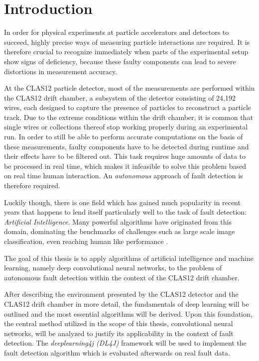 \chapter{Introduction}

In order for physical experiments at particle accelerators and
detectors to succeed, highly precise ways
of measuring particle interactions are required. It is therefore
crucial to recognize immediately when parts of the experimental setup
show signs of deficiency, because these faulty components can lead to
severe distortions in measurement accuracy.

At the CLAS12 particle detector, most of the measurements are
performed within the CLAS12 drift chamber, a subsystem of the detector
consisting of 24,192 wires, each designed to capture the presence of
particles to reconstruct a particle track. Due to the extreme
conditions within the drift chamber, it
is common that single wires or collections thereof stop working
properly during an experimental run. In order to still be able to
perform accurate computations on the basis of these measurements,
faulty components have to be detected during runtime and their effects
have to be filtered out. This task requires huge amounts of data to be
processed in real time, which makes it infeasible to solve this
problem based on real time human interaction. An \textit{autonomous}
approach of fault detection is therefore required.

Luckily though, there is one field which has gained much popularity
in recent years that happens to lend itself particularly well to
the task of fault detection: \textit{Artificial
  Intelligence}. Many powerful algorithms have originated from this
domain, dominating the benchmarks of challenges such
as large scale image classification, even reaching human like
performance \cite{Russakovsky}.

The goal of this thesis is to apply algorithms of artificial
intelligence and machine learning, namely deep convolutional neural
networks, to the problem of autonomous fault detection within the
context of the CLAS12 drift chamber.

After describing the environment presented by the CLAS12 detector and
the CLAS12 drift chamber in more detail, the fundamentals of deep
learning will be outlined and the most essential algorithms will be
derived. Upon this foundation, the central method utilized in the
scope of this thesis, convolutional neural networks, will be analyzed
to justify its applicability in the context of fault detection. The
\textit{deeplearning4j (DL4J)} framework will be used to implement the
fault detection algorithm which is evaluated afterwards on real fault
data.
